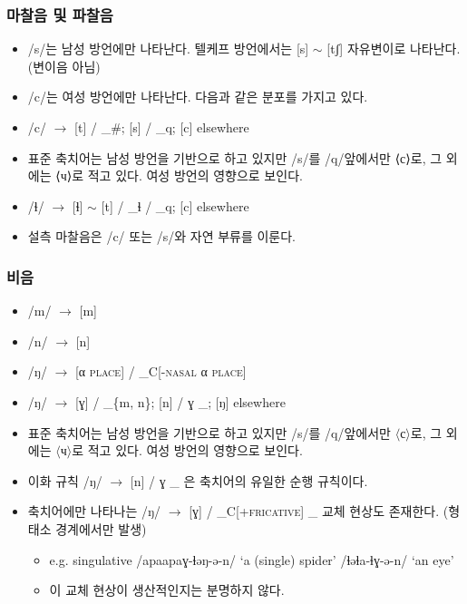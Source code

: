 \subsubsection{마찰음 및 파찰음}
\begin{itemize}
\item /s/는 남성 방언에만 나타난다. 텔케프 방언에서는 [s] $\sim$ [tʃ] 자유변이로 나타난다. (변이음 아님)
\item /c/는 여성 방언에만 나타난다. 다음과 같은 분포를 가지고 있다.
\item /c/ $\rightarrow$ [t] / \_\#; [s] / \_q; [c] elsewhere
\item 표준 축치어는 남성 방언을 기반으로 하고 있지만 /s/를 /q/앞에서만 ⟨с⟩로, 그 외에는 ⟨ч⟩로 적고 있다. 여성 방언의 영향으로 보인다.
\item /ɬ/ $\rightarrow$ [ɬ] $\sim$ [t] / \_ɬ / \_q; [c] elsewhere
\item 설측 마찰음은 /c/ 또는 /s/와 자연 부류를 이룬다.
\end{itemize}

\subsubsection{비음}
\begin{itemize}
\item /m/ $\rightarrow$ [m]
\item /n/ $\rightarrow$ [n]
\item /ŋ/ $\rightarrow$ [α \textsc{place}] / \_C[-\textsc{nasal} α \textsc{place}]
\item /ŋ/ $\rightarrow$ [ɣ] / \_\{m, n\}; [n] / ɣ \_; [ŋ] elsewhere
\item 표준 축치어는 남성 방언을 기반으로 하고 있지만 /s/를 /q/앞에서만 $\langle$с$\rangle$로, 그 외에는 $\langle$ч$\rangle$로 적고 있다. 여성 방언의 영향으로 보인다.
\item 이화 규칙 /ŋ/ $\rightarrow$ [n] / ɣ \_ 은 축치어의 유일한 순행 규칙이다.
\item 축치어에만 나타나는 /ŋ/ $\rightarrow$ [ɣ] / \_C[+\textsc{fricative}] \_ 교체 현상도 존재한다. (형태소 경계에서만 발생)
\begin{itemize}
\item e.g. singulative /apaapaɣ-ɬəŋ-ə-n/ `a (single) spider’ /ɬəɬa-ɬɣ-ə-n/ `an eye’
\item 이 교체 현상이 생산적인지는 분명하지 않다.
\end{itemize}
\end{itemize}

